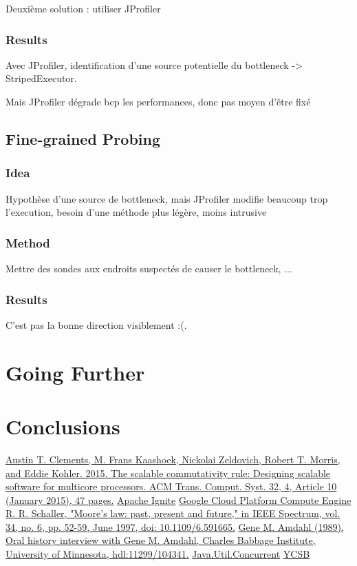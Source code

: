 \documentclass[conference]{IEEEtran}
\begin{document}
Deuxième solution : utiliser JProfiler
\subsubsection{Results}
Avec JProfiler, identification d'une source potentielle du bottleneck -> StripedExecutor.

Mais JProfiler dégrade bcp les performances, donc pas moyen d'être fixé

\subsection{Fine-grained Probing}
\subsubsection{Idea}
Hypothèse d'une source de bottleneck, mais JProfiler modifie beaucoup trop l'execution, besoin d'une méthode plus légère, moins intrusive

\subsubsection{Method}
Mettre des sondes aux endroits suspectés de causer le bottleneck, ...
\subsubsection{Results}
C'est pas la bonne direction visiblement :(.

\bigbreak


\section{Going Further}
\bigbreak
\section{Conclusions}
\bigbreak



\begin{thebibliography}{00}
 \href{https://dl.acm.org/doi/10.1145/2699681}{Austin T. Clements, M. Frans Kaashoek, Nickolai Zeldovich, Robert T. Morris, and Eddie Kohler. 2015. The scalable commutativity rule: Designing scalable software for multicore processors. ACM Trans. Comput. Syst. 32, 4, Article 10 (January 2015), 47 pages.}
 \href{https://ignite.apache.org/docs/latest/}{Apache Ignite}
 \href{https://cloud.google.com/compute/docs}{Google Cloud Platform Compute Engine}
 \href{https://ieeexplore.ieee.org/document/591665}{R. R. Schaller, "Moore's law: past, present and future," in IEEE Spectrum, vol. 34, no. 6, pp. 52-59, June 1997, doi: 10.1109/6.591665.}
 \href{https://conservancy.umn.edu/handle/11299/104341}{Gene M. Amdahl (1989), Oral history interview with Gene M. Amdahl, Charles Babbage Institute, University of Minnesota, hdl:11299/104341.}
 \href{https://docs.oracle.com/javase/8/docs/api/index.html?java/util/concurrent/package-summary.html}{Java.Util.Concurrent}
 \href{https://ycsb.site}{YCSB}

\end{thebibliography}

\vspace{12pt}
\end{document}

